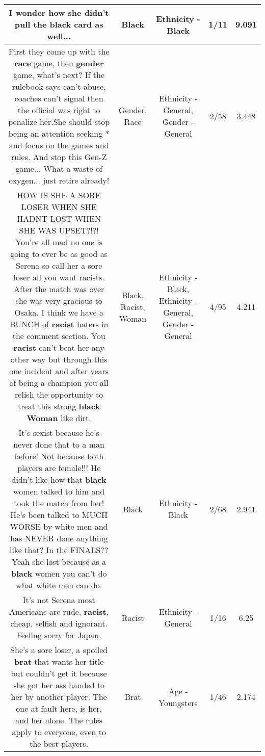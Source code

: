 \documentclass[11pt]{article}
\newlength\mylength
\begin{document}
\begin{center}
\begin{longtable}{|C{.65\mylength}|C{.30\mylength}|C{.12\mylength}|C{.12\mylength}|C{.12\mylength}|}
  \small I wonder how she didn't pull the \textbf{black} card as well...\normalsize   & Black & Ethnicity - Black & 1/11 & 9.091 \\  \hline
  \small First they come up with the \textbf{race} game, then \textbf{gender} game, what's next? If the rulebook says can't abuse, coaches can't signal then the official was right to penalize her.She should stop being an attention seeking * and focus on the games and rules. And stop this Gen-Z game... What a waste of oxygen... just retire already!\normalsize   & Gender, Race & Ethnicity - General, Gender - General & 2/58 & 3.448 \\  \hline
  \small HOW IS SHE A SORE LOSER WHEN SHE HADNT LOST WHEN SHE WAS UPSET?!?! You're all mad no one is going to ever be as good as Serena so call her a sore loser all you want racists. After the match was over she was very gracious to Osaka. I think we have a BUNCH of \textbf{racist} haters in the comment section. You \textbf{racist} can't beat her any other way but through this one incident and after years of being a champion you all relish the opportunity to treat this strong \textbf{black} \textbf{Woman} like dirt.\normalsize   & Black, Racist, Woman & Ethnicity - Black, Ethnicity - General, Gender - General & 4/95 & 4.211 \\  \hline
  \small It's sexist because he's never done that to a man before! Not because both players are female!!! He didn't like how that \textbf{black} women talked to him and took the match from her! He's been talked to MUCH WORSE by white men and has NEVER done anything like that? In the FINALS?? Yeah she lost because as a \textbf{black} women you can't do what white men can do.\normalsize   & Black & Ethnicity - Black & 2/68 & 2.941 \\  \hline
  \small It's not Serena most Americans are rude, \textbf{racist}, cheap, selfish and ignorant. Feeling sorry for Japan.\normalsize   & Racist & Ethnicity - General & 1/16 & 6.25 \\  \hline
  \small She's a sore loser, a spoiled \textbf{brat} that wants her title but couldn't get it because she got her ass handed to her by another player. The one at fault here, is her, and her alone. The rules apply to everyone, even to the best players.\normalsize   & Brat & Age - Youngsters & 1/46 & 2.174 \\  \hline

\end{longtable}
\end{center}
\end{document}
